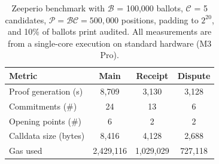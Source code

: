 \begin{table}[t!]
\centering
\caption{Zeeperio benchmark with $\mathcal{B}$ = 100,000 ballots, $\mathcal{C}$ = 5 candidates, $\mathcal{P} = \mathcal{B}\mathcal{C} = 500,000$ positions, padding to $2^{20}$, and 10\% of ballots print audited. All measurements are from a single-core execution on standard hardware (M3 Pro).}
\begin{tabular}{lccc}
\hline
\textbf{Metric} & \textbf{Main} & \textbf{Receipt} & \textbf{Dispute} \\
\hline
Proof generation (s) & 8,709 & 3,130 & 3,128 \\
Commitments (\#) & 24 & 13 & 6 \\
Opening points (\#) & 6 & 2 & 2 \\
Calldata size (bytes) & 8,416 & 4,128 & 2,688 \\
Gas used & 2,429,116 & 1,029,029 & 727,118 \\
\hline
\end{tabular}
\label{tab:eval-table2}
\end{table}
